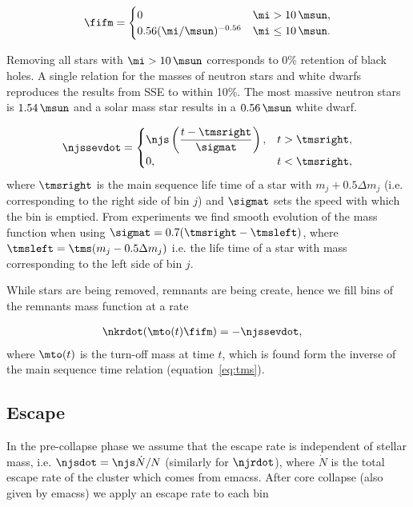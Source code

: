 \begin{align}
\fifm=
\begin{cases}
0 & \mi>10\,\msun,\\
0.56(\mi/\msun)^{-0.56} & \mi\le10\,\msun.
\end{cases}
\end{align}

Removing all stars with $\mi>10\,\msun$ corresponds to 0\% retention of black
holes. A single relation for the masses of neutron stars and white dwarfs
reproduces the results from SSE to within 10\%. The most massive neutron stars
is $1.54\,\msun$ and a solar mass star results in a $0.56\,\msun$ white dwarf.

\begin{align}
\njssevdot  = 
\begin{cases}
    \njs\left(\dfrac{t-\tmsright}{\sigmat}\right), &t>\tmsright,\\
0,& t<\tmsright,
\end{cases}
\end{align}
where $\tmsright$ is the main sequence life time of a star with $m_j + 0.5\Delta
m_j$ (i.e. corresponding to the right side of  bin $j$) and $\sigmat$ sets the
speed with which the bin is emptied. From experiments we find smooth evolution
of the mass function when using $\sigmat = 0.7(\tmsright-\tmsleft)$, where
$\tmsleft = \tms(m_j-0.5\Delta m_j)$ i.e. the life time of a star with mass
corresponding to the left side of bin  $j$.

While stars are being removed, remnants are being create, hence we fill bins of
the remnants mass function at a rate

\begin{align}
\nkrdot(\mto(t)\fifm)&=- \njssevdot,
\end{align}
where $\mto(t)$ is the turn-off mass at time $t$, which is found form the
inverse of the main sequence time relation (equation~\ref{eq:tms}).

\subsection{Escape}
In the pre-collapse phase we assume that the escape rate is independent of
stellar mass, i.e. $\njsdot = \njs \dot{N}/N$ (similarly for $\njrdot$), where
$\dot{N}$ is the total escape rate of the cluster which comes from {\sc emacss}.
After core collapse (also given by {\sc emacss}) we apply an escape rate to each
bin

